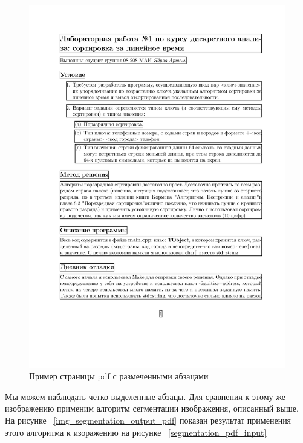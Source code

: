 \begin{figure}
    \includegraphics[scale=0.65]{img/paragraph/pdf_output.jpg}
    \caption{Пример страницы pdf с размеченными абзацами}
    \label{segmentation_pdf_output}
\end{figure}

Мы можем наблюдать четко выделенные абзацы. Для сравнения к этому же изображению применим алгоритм сегментации изображения, описанный выше. На рисунке ~\ref{img_segmentation_output_pdf} показан результат применения этого алгоритма к изоражению на рисунке ~\ref{segmentation_pdf_input}

